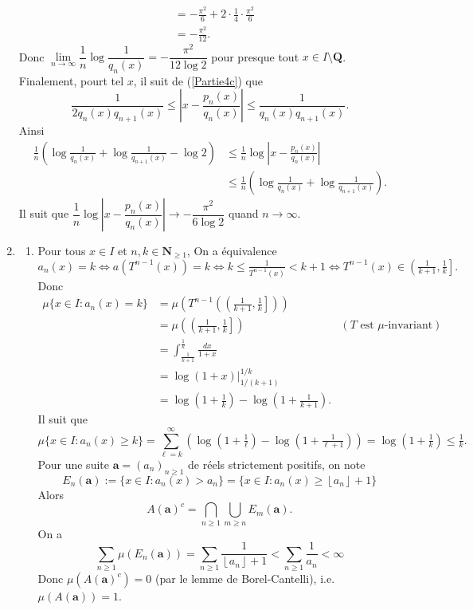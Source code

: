 \documentclass[french]{article}
\theoremstyle{definition}
\newcommand{\tuple}[1]{\left(#1\right)}
\newcommand{\oin}[1]{\left(#1\right)}
\newcommand{\olin}[1]{\left(#1\right]}
\newcommand{\abs}[1]{\left|#1\right|}
\newcommand{\floor}[1]{\left\lfloor#1\right\rfloor}
\newcommand{\Nbb}{\mathbf{N}}
\newcommand{\Qbb}{\mathbf{Q}}
\newcommand{\abf}{\mathbf{a}}
\begin{document}
\begin{enumerate}
\begin{align*}
                & = -\frac{\pi^2}{6} + 2\cdot \frac{1}{4} \cdot \frac{\pi^2}{6}\\
                & = -\frac{\pi^2}{12}.
            \end{align*}
        Donc $\lim\limits_{n \to \infty}\dfrac{1}{n}\log\dfrac{1}{q_n(x)} = -\dfrac{\pi^2}{12 \log 2}$ pour presque tout $x \in I \setminus \Qbb$. Finalement, pourt tel $x$, il suit de (\ref{Partie4c}) que
            $$\frac{1}{2q_n(x)q_{n+1}(x)} \le \abs{x - \frac{p_n(x)}{q_n(x)}} \le \frac{1}{q_n(x)q_{n+1}(x)}.$$
        Ainsi
           \begin{align*}
                \frac{1}{n}\oin{\log\frac{1}{q_n(x)} + \log\frac{1}{q_{n+1}(x)} - \log 2} & \le \frac{1}{n}\log\abs{x - \frac{p_n(x)}{q_n(x)}} \\
                & \le  \frac{1}{n}\oin{\log\frac{1}{q_n(x)} + \log\frac{1}{q_{n+1}(x)}}.
           \end{align*}
        Il suit que $\dfrac{1}{n}\log\abs{x - \dfrac{p_n(x)}{q_n(x)}} \to -\dfrac{\pi^2}{6\log 2}$ quand $n \to \infty$.
            
    \item \label{Partie13}
        \begin{enumerate}
            \item \label{Partie13a} Pour tous $x \in I$ et $n,k \in \Nbb_{\ge 1}$, On a \'equivalence
                $$a_n(x) = k \Leftrightarrow a(T^{n-1}(x)) = k \Leftrightarrow k \le \tfrac{1}{T^{n-1}(x)} < k+1 \Leftrightarrow T^{n-1}(x) \in \olin{\tfrac{1}{k+1},\tfrac{1}{k}}.$$
            Donc
                \begin{align*}
                    \mu\{x \in I : a_n(x) = k \} & = \mu\tuple{T^{n-1}\tuple{\olin{\tfrac{1}{k+1},\tfrac{1}{k}}}} \\
                    & = \mu\tuple{\olin{\tfrac{1}{k+1},\tfrac{1}{k}}} & (T \text{ est } \mu \text{-invariant})\\
                    & = \int_{\tfrac{1}{k+1}}^{\tfrac{1}{k}} \frac{dx}{1+x}\\
                    & = \log(1+x) \Big|^{1/k}_{1/(k+1)}\\
                    & = \log \tuple{1 + \tfrac{1}{k}} - \log\tuple{1 + \tfrac{1}{k+1}}.
                \end{align*}
            Il suit que
                 $$\mu\{x \in I : a_n(x) \ge k\} = \sum_{\ell = k}^{\infty} \tuple{\log \tuple{1 + \tfrac{1}{\ell}} - \log\tuple{1 + \tfrac{1}{\ell+1}}} = \log\tuple{1 + \tfrac{1}{k}} \le \tfrac{1}{k}.$$
            Pour une suite $\abf = (a_n)_{n \ge 1}$ de r\'eels strictement positifs, on note
                $$E_n(\abf):=\{x \in I : a_n(x) > a_n\} = \{x \in I: a_n(x) \ge \floor{a_n} + 1\}$$
            Alors
                $$A(\abf)^c = \bigcap_{n \ge 1} \bigcup_{m \ge n} E_m(\abf).$$
            On a
                $$\sum_{n \ge 1}\mu(E_n(\abf)) = \sum_{n \ge 1}\frac{1}{\floor{a_n} + 1} < \sum_{n \ge 1}\frac{1}{a_n} < \infty$$
            Donc $\mu(A(\abf)^c) = 0$ (par le lemme de Borel-Cantelli), i.e. $\mu(A(\abf)) = 1$.
            

\end{enumerate}
\end{enumerate}
\end{document}
